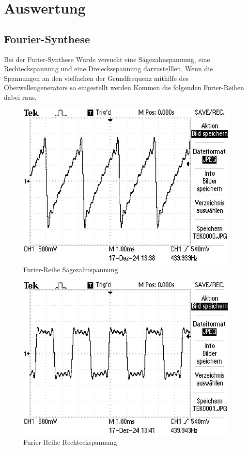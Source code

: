 \section{Auswertung}
\label{sec:Auswertung}

\subsection{Fourier-Synthese}
\noindent Bei der Furier-Synthese Wurde versucht eine 
Sägezahnspannung, eine Rechteckspannung und eine Dreiecksspannung 
darzustelllen. 
\noindent Wenn die Spannungen an den vielfachen der Grundfrequenz mithilfe des 
Oberwellengenerators so eingestellt werden Kommen die folgenden Furier-Reihen dabei raus.
\begin{figure}[H]
    \centering
    \caption{Furier-Reihe Sägezahnspannung}
    \includegraphics{Bilder/TEK0000.JPG}
\end{figure}

\begin{figure}[H]
    \centering
    \caption{Furier-Reihe Rechteckspannung}
    \includegraphics{Bilder/TEK0001.JPG}
\end{figure}

